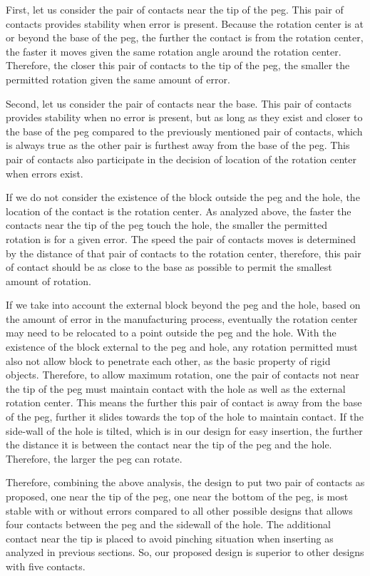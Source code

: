 \documentclass[11pt, twocolumn]{article}
\begin{document}
First, let us consider the pair of contacts near the tip of the peg. This pair of contacts provides stability when error is present. Because the rotation center is at or beyond the base of the peg, the further the contact is from the rotation center, the faster it moves given the same rotation angle around the rotation center. Therefore, the closer this pair of contacts to the tip of the peg, the smaller the permitted rotation given the same amount of error. 

Second, let us consider the pair of contacts near the base. This pair of contacts provides stability when no error is present, but as long as they exist and closer to the base of the peg compared to the previously mentioned pair of contacts, which is always true as the other pair is furthest away from the base of the peg. This pair of contacts also participate in the decision of location of the rotation center when errors exist. 

If we do not consider the existence of the block outside the peg and the hole, the location of the contact is the rotation center. As analyzed above, the faster the contacts near the tip of the peg touch the hole, the smaller the permitted rotation is for a given error. The speed the pair of contacts moves is determined by the distance of that pair of contacts to the rotation center, therefore, this pair of contact should be as close to the base as possible to permit the smallest amount of rotation. 

If we take into account the external block beyond the peg and the hole, based on the amount of error in the manufacturing process, eventually the rotation center may need to be relocated to a point outside the peg and the hole. With the existence of the block external to the peg and hole, any rotation permitted must also not allow block to penetrate each other, as the basic property of rigid objects. Therefore, to allow maximum rotation, one the pair of contacts not near the tip of the peg must maintain contact with the hole as well as the external rotation center. This means the further this pair of contact is away from the base of the peg, further it slides towards the top of the hole to maintain contact. If the side-wall of the hole is tilted, which is in our design for easy insertion, the further the distance it is between the contact near the tip of the peg and the hole. Therefore, the larger the peg can rotate. 

Therefore, combining the above analysis, the design to put two pair of contacts as proposed, one near the tip of the peg, one near the bottom of the peg, is most stable with or without errors compared to all other possible designs that allows four contacts between the peg and the sidewall of the hole. The additional contact near the tip is placed to avoid pinching situation when inserting as analyzed in previous sections. So, our proposed design is superior to other designs with five contacts. 
\end{document}
